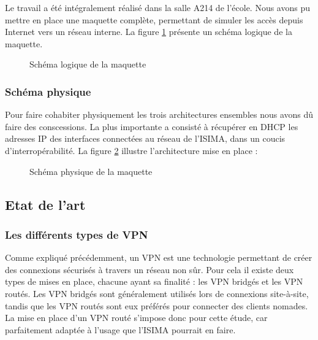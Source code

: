 Le travail a été intégralement réalisé dans la salle A214 de l'école. Nous avons pu mettre en place une maquette complète, permettant de simuler les accès depuis Internet vers un réseau interne. La figure \ref{schema-logique-maquette} présente un schéma logique de la maquette.

\begin{figure}[H]
	\begin{center}
	\end{center}
	\caption{Schéma logique de la maquette}
	\label{schema-logique-maquette}
\end{figure}

\subsubsection{Schéma physique}

Pour faire cohabiter physiquement les trois architectures ensembles nous avons dû faire des conscessions. La plus importante a consisté à récupérer en DHCP les adresses IP des interfaces connectées au réseau de l'ISIMA, dans un coucis d'interropérabilité. La figure \ref{schema-physique-maquette} illustre l'architecture mise en place :

\begin{figure}[H]
	\begin{center}
	\end{center}
	\caption{Schéma physique de la maquette}
	\label{schema-physique-maquette}
\end{figure}

\subsection{Etat de l'art}

\subsubsection{Les différents types de VPN}

Comme expliqué précédemment, un VPN est une technologie permettant de créer des connexions sécurisés à travers un réseau non sûr. Pour cela il existe deux types de mises en place, chacune ayant sa finalité : les VPN bridgés et les VPN routés. Les VPN bridgés sont généralement utilisés lors de connexions site-à-site, tandis que les VPN routés sont eux préférés pour connecter des clients nomades. La mise en place d'un VPN routé s'impose donc pour cette étude, car parfaitement adaptée à l'usage que l'ISIMA pourrait en faire.

